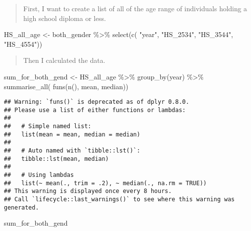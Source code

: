 \documentclass[
]{article}
\newenvironment{Shaded}{\begin{snugshade}}{\end{snugshade}}
\newcommand{\FunctionTok}[1]{\textcolor[rgb]{0.00,0.00,0.00}{#1}}
\newcommand{\NormalTok}[1]{#1}
\newcommand{\OtherTok}[1]{\textcolor[rgb]{0.56,0.35,0.01}{#1}}
\newcommand{\SpecialCharTok}[1]{\textcolor[rgb]{0.00,0.00,0.00}{#1}}
\newcommand{\StringTok}[1]{\textcolor[rgb]{0.31,0.60,0.02}{#1}}
\begin{document}
\begin{quote}
First, I want to create a list of all of the age range of individuals
holding a high school diploma or less.
\end{quote}

\begin{Shaded}
\begin{Highlighting}[]
\NormalTok{HS\_all\_age }\OtherTok{\textless{}{-}}\NormalTok{ both\_gender }\SpecialCharTok{\%\textgreater{}\%} 
  \FunctionTok{select}\NormalTok{(}\FunctionTok{c}\NormalTok{(}
    \StringTok{"year"}\NormalTok{,}
    \StringTok{"HS\_2534"}\NormalTok{,}
    \StringTok{"HS\_3544"}\NormalTok{,}
    \StringTok{"HS\_4554"}\NormalTok{))}
\end{Highlighting}
\end{Shaded}

\begin{quote}
Then I calculated the data.
\end{quote}

\begin{Shaded}
\begin{Highlighting}[]
\NormalTok{sum\_for\_both\_gend }\OtherTok{\textless{}{-}}\NormalTok{ HS\_all\_age }\SpecialCharTok{\%\textgreater{}\%} 
  \FunctionTok{group\_by}\NormalTok{(year) }\SpecialCharTok{\%\textgreater{}\%} 
  \FunctionTok{summarise\_all}\NormalTok{(}
    \FunctionTok{funs}\NormalTok{(}\FunctionTok{n}\NormalTok{(),}
\NormalTok{         mean,}
\NormalTok{         median))}
\end{Highlighting}
\end{Shaded}

\begin{verbatim}
## Warning: `funs()` is deprecated as of dplyr 0.8.0.
## Please use a list of either functions or lambdas: 
## 
##   # Simple named list: 
##   list(mean = mean, median = median)
## 
##   # Auto named with `tibble::lst()`: 
##   tibble::lst(mean, median)
## 
##   # Using lambdas
##   list(~ mean(., trim = .2), ~ median(., na.rm = TRUE))
## This warning is displayed once every 8 hours.
## Call `lifecycle::last_warnings()` to see where this warning was generated.
\end{verbatim}

\begin{Shaded}
\begin{Highlighting}[]
\NormalTok{sum\_for\_both\_gend}
\end{Highlighting}
\end{Shaded}
\end{document}
